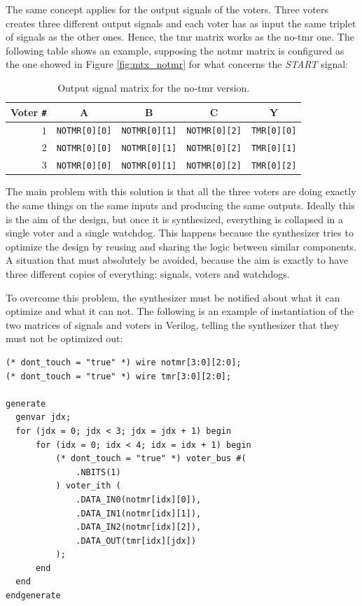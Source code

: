 The same concept applies for the output signals of the voters. Three voters creates three different output signals and each voter has as input the same triplet of signals as the other ones. Hence, the tmr matrix works as the no-tmr one. The following table shows an example, supposing the notmr matrix is configured as the one showed in Figure \ref{fig:mtx_notmr} for what concerns the \textit{START} signal:

\begin{table}[H]
\centering
\begin{tabular}{ r|ccc|c }
    \textbf{Voter \texttt{\#}}&\textbf{A}&\textbf{B}&\textbf{C}&\textbf{Y}\\
    \hline
    1 & \texttt{NOTMR[0][0]} & \texttt{NOTMR[0][1]} & \texttt{NOTMR[0][2]} & \texttt{TMR[0][0]}\\
    2 & \texttt{NOTMR[0][0]} & \texttt{NOTMR[0][1]} & \texttt{NOTMR[0][2]} & \texttt{TMR[0][1]}\\
    3 & \texttt{NOTMR[0][0]} & \texttt{NOTMR[0][1]} & \texttt{NOTMR[0][2]} & \texttt{TMR[0][2]}\\
\end{tabular}
\caption{Output signal matrix for the no-tmr version.}
\end{table}

The main problem with this solution is that all the three voters are doing exactly the same things on the same inputs and producing the same outputs. Ideally this is the aim of the design, but once it is synthesized, everything is collapsed in a single voter and a single watchdog. This happens because the synthesizer tries to optimize the design by reusing and sharing the logic between similar components. A situation that must absolutely be avoided, because the aim is exactly to have three different copies of everything: signals, voters and watchdogs.\bigskip

To overcome this problem, the synthesizer must be notified about what it can optimize and what it can not. The following is an example of instantiation of the two matrices of signals and voters in Verilog, telling the synthesizer that they must not be optimized out:

\begin{lstlisting}[style=Verilog]
(* dont_touch = "true" *) wire notmr[3:0][2:0];
(* dont_touch = "true" *) wire tmr[3:0][2:0];

generate
  genvar jdx;
  for (jdx = 0; jdx < 3; jdx = jdx + 1) begin
      for (idx = 0; idx < 4; idx = idx + 1) begin
          (* dont_touch = "true" *) voter_bus #(
              .NBITS(1)
          ) voter_ith (
              .DATA_IN0(notmr[idx][0]),
              .DATA_IN1(notmr[idx][1]),
              .DATA_IN2(notmr[idx][2]),
              .DATA_OUT(tmr[idx][jdx])
          );
      end
  end
endgenerate
\end{lstlisting}

